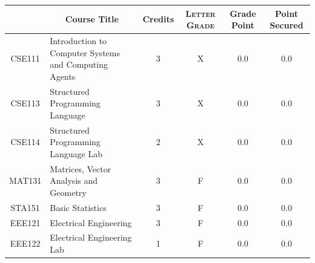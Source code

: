 \documentclass[11pt]{article}
\newcommand*{\numtwo}[1]{\pgfmathprintnumber[
                    fixed, precision=2, fixed zerofill=true]{#1}}
\begin{document}
                \begin{center}
                    \renewcommand{\arraystretch}{1.08}
                    
                \begin{tabular}{|c|l|c|>{\scshape}c|c|c|}
                \hline  \rule[-1ex]{0pt}{3.5ex} {\centering{\bf Course Code}} &  \multicolumn{1}{c|}{\textbf{Course Title}}  & {\bf Credits} & {\bf Letter Grade} & {\bf Grade Point} & {\bf Point Secured}  \\ 
                \hline   CSE111 &  Introduction to Computer Systems and Computing Agents		 & 3 & X & 0.0 & 0.0 \\ %
                \hline   CSE113 &  Structured Programming Language		 & 3 & X & 0.0 & 0.0 \\ %
                \hline   CSE114 &  Structured Programming Language Lab		 & 2 & X & 0.0 & 0.0 \\ %
                \hline   MAT131 &  Matrices, Vector Analysis and Geometry		 & 3 & F & 0.0 & 0.0 \\ %
                \hline   STA151 &  Basic Statistics		 & 3 & F & 0.0 & 0.0 \\ %
                \hline   EEE121 &  Electrical Engineering		 & 3 & F & 0.0 & 0.0 \\ %
                \hline   EEE122 &  Electrical Engineering Lab		 & 1 & F & 0.0 & 0.0 \\ %

\hline                %
                \end{tabular}
                \end{center}
                \renewcommand{\arraystretch}{1.03}
\end{document}
